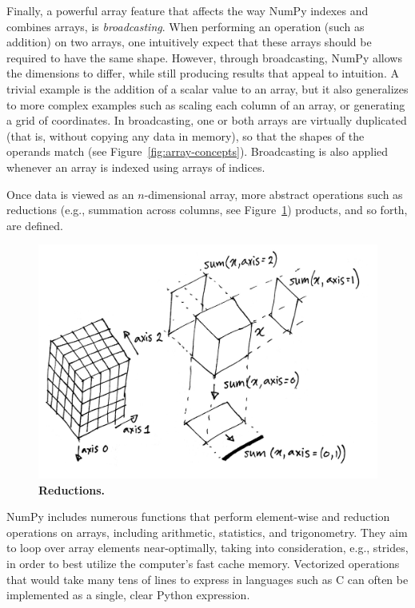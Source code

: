 Finally, a powerful array feature that affects the way NumPy indexes and combines arrays, is {\em broadcasting}. When performing an operation (such as addition) on two arrays, one intuitively expect that these arrays should be required to have the same shape.  However, through broadcasting, NumPy allows the dimensions to differ, while still producing results that appeal to intuition.  A trivial example is the addition of a scalar value to an array, but it also generalizes to more complex examples such as scaling each column of an array, or generating a grid of coordinates.  In broadcasting, one or both arrays are virtually duplicated (that is, without copying any data in memory), so that the shapes of the operands match (see Figure~\ref{fig:array-concepts}).  Broadcasting is also applied whenever an array is indexed using arrays of indices.%

Once data is viewed as an $n$-dimensional array, more abstract operations such
as reductions (e.g., summation across columns, see Figure~\ref{fig:reductions}) products, and so forth, are
defined.

\begin{figure}
  \centering
  \includegraphics[width=\linewidth]{static/sketches/reductions}
  \caption{\textbf{Reductions.} 
   }
  \label{fig:reductions}
\end{figure}


NumPy includes numerous functions that perform element-wise and reduction operations on arrays, including arithmetic, statistics, and trigonometry.  They aim to loop over array elements near-optimally, taking into consideration, e.g., strides, in order to best utilize the computer's fast cache memory.  Vectorized operations that would take many tens of lines to express in languages such as C can often be implemented as a single, clear Python expression.


